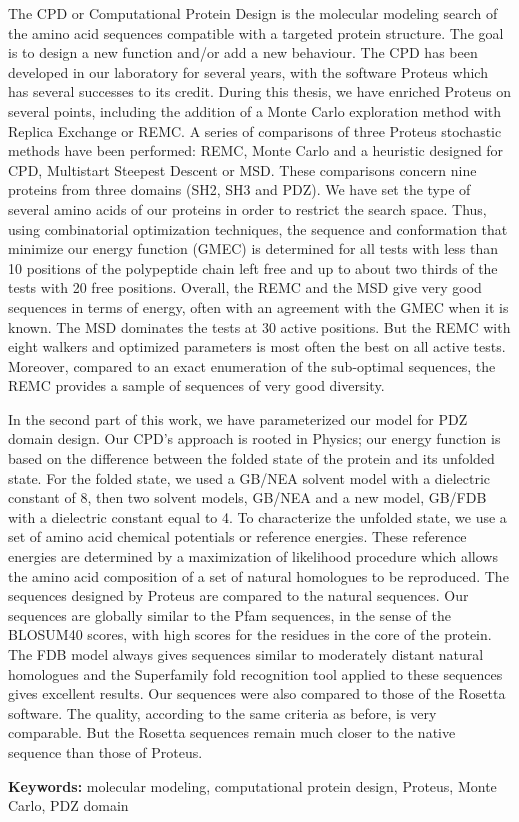 The CPD or Computational Protein Design  is the molecular modeling search of the amino acid sequences compatible with a targeted protein structure. The goal is to design a new function and/or add a new behaviour. The CPD has been developed in our laboratory for several years, with the software Proteus which has several successes to its credit.
During this thesis, we have enriched Proteus on several points, including the addition of a Monte Carlo exploration method with Replica Exchange or REMC. A series of comparisons of three Proteus stochastic methods have been performed: REMC, Monte Carlo and a heuristic designed for CPD, Multistart Steepest Descent or MSD. These comparisons concern nine proteins from three domains (SH2, SH3 and PDZ). We have set the type of several amino acids of our proteins in order to restrict the search space. Thus, using combinatorial optimization techniques, the sequence and conformation that minimize our energy function (GMEC) is determined for all tests with less than 10 positions of the polypeptide chain left free and up to about two thirds of the tests with 20 free positions. Overall, the REMC and the MSD give very good sequences in terms of energy, often with an agreement with the GMEC when it is known. The MSD dominates the tests at 30 active positions. But the REMC with eight walkers and optimized parameters is most often the best on all active tests. Moreover, compared to an exact enumeration of the sub-optimal sequences, the REMC provides a sample of sequences of very good diversity.

In the second part of this work, we have parameterized our model for PDZ domain design. Our CPD's approach is rooted in Physics; our energy function is based on the difference between the folded state of the protein and its unfolded state. For the folded state, we used a GB/NEA solvent model with a dielectric constant of 8, then two solvent models, GB/NEA and a new model, GB/FDB with a dielectric constant equal to 4. To characterize the unfolded state, we use a set of amino acid chemical potentials or reference energies. These reference energies are determined by a maximization of likelihood procedure which allows the amino acid composition of a set of natural homologues to be reproduced. The sequences designed by Proteus are compared to the natural sequences. Our sequences are globally similar to the Pfam sequences, in the sense of the BLOSUM40 scores, with high scores for the residues in the core of the protein. The FDB model always gives sequences similar to moderately distant natural homologues and the Superfamily fold recognition tool applied to these sequences gives excellent results. Our sequences were also compared to those of the Rosetta software. The quality, according to the same criteria as before, is very comparable. But the Rosetta sequences remain much closer to the native sequence than those of Proteus.

\bigskip

\textbf{Keywords:} molecular modeling, computational protein design, Proteus, Monte Carlo, PDZ domain






